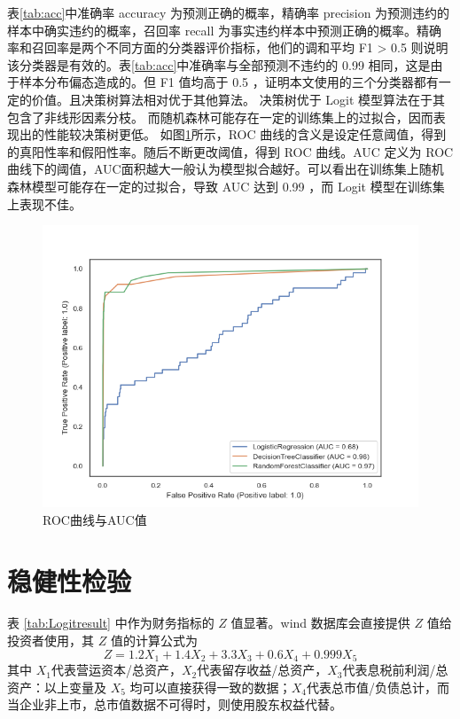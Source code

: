表\ref{tab:acc}中准确率 accuracy 为预测正确的概率，精确率 precision 为预测违约的样本中确实违约的概率，召回率 recall 为事实违约样本中预测正确的概率。精确率和召回率是两个不同方面的分类器评价指标，他们的调和平均 F1 > 0.5 则说明该分类器是有效的。表\ref{tab:acc}中准确率与全部预测不违约的 0.99 相同，这是由于样本分布偏态造成的。但 F1 值均高于 0.5 ，证明本文使用的三个分类器都有一定的价值。且决策树算法相对优于其他算法。
决策树优于 Logit 模型算法在于其包含了非线形因素分枝。
而随机森林可能存在一定的训练集上的过拟合，因而表现出的性能较决策树更低。
如图\ref{fig:roc}所示，ROC 曲线的含义是设定任意阈值，得到的真阳性率和假阳性率。随后不断更改阈值，得到 ROC 曲线。AUC 定义为 ROC 曲线下的阈值，AUC面积越大一般认为模型拟合越好。可以看出在训练集上随机森林模型可能存在一定的过拟合，导致 AUC 达到 0.99 ，而 Logit 模型在训练集上表现不佳。
\begin{figure}[h]
	\centering
	\includegraphics[width=.9\linewidth]{./data/roc.png}
	\caption{\label{fig:roc}ROC曲线与AUC值}
\end{figure}

\section{稳健性检验}
表 \ref{tab:Logitresult} 中作为财务指标的 \(Z\) 值显著。wind 数据库会直接提供 \(Z\) 值给投资者使用，其 \(Z\) 值的计算公式为
\begin{equation}
	\label{eq:1}
	Z=1.2X_1+1.4X_2+3.3X_3+0.6X_4+0.999X_5
\end{equation}
其中 \(X_1\)代表营运资本/总资产，\(X_2\)代表留存收益/总资产，\(X_3\)代表息税前利润/总资产：以上变量及 \(X_5\) 均可以直接获得一致的数据；\(X_4\)代表总市值/负债总计，而当企业非上市，总市值数据不可得时，则使用股东权益代替。

